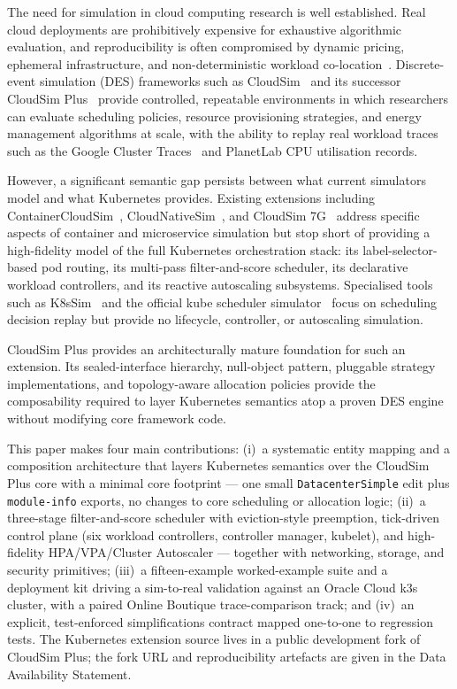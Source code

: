 \documentclass[ASNA,twocolumn]{USG}
\begin{document}
    The need for simulation in cloud computing research is well
    established. Real cloud deployments are prohibitively expensive for
    exhaustive algorithmic evaluation, and reproducibility is often
    compromised by dynamic pricing, ephemeral infrastructure, and
    non-deterministic workload co-location~\cite{Calheiros2011,Pucher2015}.
    Discrete-event simulation (DES) frameworks such as
    CloudSim~\cite{Calheiros2011} and its successor CloudSim Plus~\cite{Silva2017} provide controlled, repeatable environments in
    which researchers can evaluate scheduling policies, resource provisioning strategies, and energy management algorithms at scale,
    with the ability to replay real workload traces such as the Google Cluster Traces~\cite{Bappy2023} and PlanetLab CPU utilisation records.

    However, a significant semantic gap persists between what current
    simulators model and what Kubernetes provides. Existing
    extensions including ContainerCloudSim~\cite{Piraghaj2017},
    CloudNativeSim~\cite{Wu2025}, and CloudSim 7G~\cite{Andreoli2025} address
    specific aspects of container and microservice simulation but stop
    short of providing a high-fidelity model of the full Kubernetes
    orchestration stack: its label-selector-based pod routing, its
    multi-pass filter-and-score scheduler, its declarative workload
    controllers, and its reactive autoscaling subsystems. Specialised tools
    such as K8sSim~\cite{Wen2023} and the official kube scheduler
    simulator~\cite{KubeSchSim2025} focus on scheduling decision replay but
    provide no lifecycle, controller, or autoscaling simulation.

    CloudSim Plus provides an architecturally mature foundation for such an
    extension. Its sealed-interface hierarchy, null-object pattern,
    pluggable strategy implementations, and topology-aware allocation
    policies provide the composability required to layer Kubernetes
    semantics atop a proven DES engine without modifying core framework code.

    This paper makes four main contributions:
    (i)~a systematic entity mapping and a composition architecture
    that layers Kubernetes semantics over the CloudSim Plus core with a
    minimal core footprint --- one small \texttt{DatacenterSimple} edit
    plus \texttt{module-info} exports, no changes to core scheduling or
    allocation logic;
    (ii)~a three-stage filter-and-score scheduler with eviction-style
    preemption, tick-driven control plane (six workload controllers,
    controller manager, kubelet), and high-fidelity HPA/VPA/Cluster
    Autoscaler --- together with networking, storage, and security
    primitives;
    (iii)~a fifteen-example worked-example suite and a deployment kit driving a
    sim-to-real validation against an Oracle Cloud k3s cluster, with a
    paired Online Boutique trace-comparison track; and
    (iv)~an explicit, test-enforced simplifications contract
    mapped one-to-one to regression
    tests. 
    The Kubernetes extension source lives in a public development fork of
    CloudSim Plus; the fork URL and reproducibility artefacts are given in
    the Data Availability Statement.%
\end{document}
